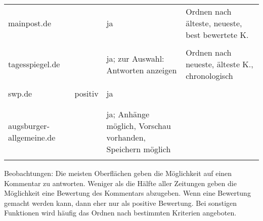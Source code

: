\begin{landscape}
\begin{longtable}{l|p{40mm}p{40mm}p{80mm}}
  mainpost.de & & ja & Ordnen nach älteste, neueste, best bewertete K.\\
           & \multicolumn{3}{c}{}\\\hline

  tagesspiegel.de & & ja; zur Auswahl: Antworten anzeigen &
    Ordnen nach neueste, älteste K., chronologisch\\
    & \multicolumn{3}{c}{}\\\hline

    swp.de & positiv & ja & \\
        & \multicolumn{3}{c}{}\\\hline \\

    augsburger-allgemeine.de &
      & ja; Anhänge möglich, Vorschau vorhanden, Speichern möglich & \\
      & \multicolumn{3}{c}{}\\\hline

\end{longtable}
\end{landscape}

Beobachtungen: Die meisten Oberflächen geben die Möglichkeit auf einen Kommentar
zu antworten. Weniger als die Hälfte aller Zeitungen geben die Möglichkeit eine
Bewertung des Kommentars abzugeben. Wenn eine Bewertung gemacht werden kann,
dann eher nur als positive Bewertung. Bei sonstigen Funktionen wird häufig das
Ordnen nach bestimmten Kriterien angeboten. 

